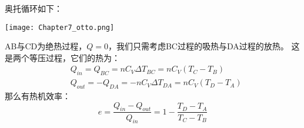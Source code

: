         \begin{prove}
            奥托循环如下：
            \begin{center}
                \texttt{[image: Chapter7\_otto.png]}
            \end{center}
            AB与CD为绝热过程，$Q = 0$，我们只需考虑BC过程的吸热与DA过程的放热。
            这是两个等压过程，它们的热为：
            \begin{equation}
                \begin{aligned}
                    &Q_{in} = Q_{BC} = nC_{V}\Delta T_{BC}= nC_{V}(T_{C} - T_{B})\\
                    &Q_{out} = -Q_{DA} = -nC_{V}\Delta T_{DA}= nC_{V}(T_{D} - T_{A})
                \end{aligned}
                \nonumber
            \end{equation}
            那么有热机效率：
            \begin{equation}
                e = \frac{Q_{in}-Q_{out}}{Q_{in}} = 1 - \frac{T_{D} - T_{A}}{T_{C} - T_{B}}
            \end{equation}
        \end{prove}
